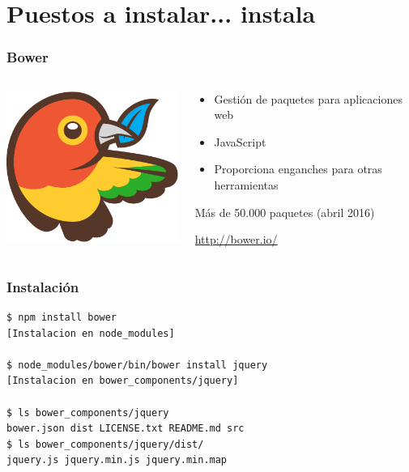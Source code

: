 %
%

\section{Puestos a instalar... instala}

\begin{frame}
\frametitle{Bower}

\begin{columns}[T]
\begin{column}{.48\textwidth}
\includegraphics[width=6.5cm]{figs/bower-logo}

\end{column}%
\hfill%
\begin{column}{.50\textwidth}
{\Large
\begin{itemize}
\item Gestión de paquetes para aplicaciones web
\item JavaScript
\item Proporciona enganches para otras herramientas
\end{itemize}

\vspace{.5cm}

Más de 50.000 paquetes (abril 2016)
\vspace{.5cm}

\begin{flushright}
  {\Large
    \url{http://bower.io/}
  }
\end{flushright}

}
\end{column}%
\end{columns}

\end{frame}

\begin{frame}[fragile]
\frametitle{Instalación}

{\Large
\begin{verbatim}
$ npm install bower
[Instalacion en node_modules]

$ node_modules/bower/bin/bower install jquery
[Instalacion en bower_components/jquery]

$ ls bower_components/jquery
bower.json dist LICENSE.txt README.md src
$ ls bower_components/jquery/dist/
jquery.js jquery.min.js jquery.min.map
\end{verbatim}
}

\end{frame}

